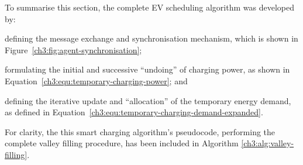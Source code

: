 To summarise this section, the complete EV scheduling algorithm was developed by: 
\begin{enumerate*}
	\item defining the message exchange and synchronisation mechanism, which is shown in Figure~\ref{ch3:fig:agent-synchronisation};
	\item formulating the initial and successive ``undoing'' of charging power, as shown in Equation~\ref{ch3:equ:temporary-charging-power}; and
	\item defining the iterative update and ``allocation'' of the temporary energy demand, as defined in Equation~\ref{ch3:equ:temporary-charging-demand-expanded}.
\end{enumerate*}
For clarity, the this smart charging algorithm's pseudocode, performing the complete valley filling procedure, has been included in Algorithm \ref{ch3:alg:valley-filling}.















